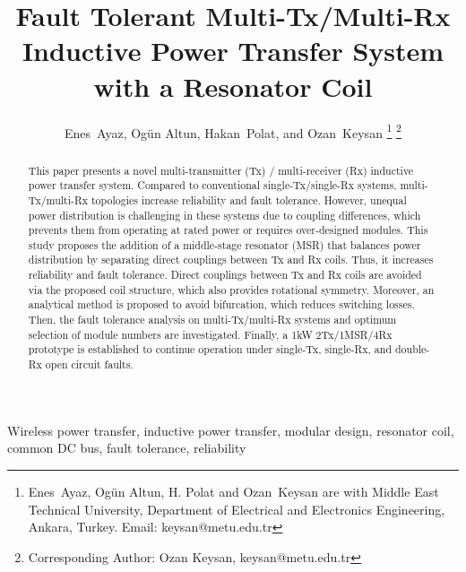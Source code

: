 \documentclass[journal]{IEEEtran}
\begin{document}

\title{ Fault Tolerant Multi-Tx/Multi-Rx Inductive Power Transfer System with a Resonator Coil}
        \author{Enes~Ayaz, Og\"{u}n Altun, Hakan~Polat, and Ozan~Keysan
			 \thanks{ Enes~Ayaz, Og\"{u}n Altun,  H. Polat and Ozan~Keysan are with Middle East Technical University, Department of Electrical and Electronics Engineering, Ankara, Turkey. Email: keysan@metu.edu.tr 
}%
\thanks{Corresponding Author: Ozan Keysan, keysan@metu.edu.tr
}%
}
\maketitle
\begin{abstract}
This paper presents a novel multi-transmitter (Tx) / multi-receiver (Rx) inductive power transfer system. 
Compared to conventional single-Tx/single-Rx systems, multi-Tx/multi-Rx topologies increase reliability and fault tolerance. 
However, unequal power distribution is challenging in these systems due to coupling differences, which prevents them from operating at rated power or requires over-designed modules.
This study proposes the addition of a middle-stage resonator (MSR) that balances power distribution by separating direct couplings between Tx and Rx coils. Thus, it increases reliability and fault tolerance.
Direct couplings between Tx and Rx coils are avoided via the proposed coil structure, which also provides rotational symmetry.
Moreover, an analytical method is proposed to avoid bifurcation, which reduces switching losses.
Then, the fault tolerance analysis on multi-Tx/multi-Rx systems and optimum selection of module numbers are investigated. 
Finally, a 1kW 2Tx/1MSR/4Rx prototype is established to continue operation under single-Tx, single-Rx, and double-Rx open circuit faults.


\end{abstract}
\begin{IEEEkeywords}
Wireless power transfer, inductive power transfer, modular design, resonator coil,  common DC bus, fault tolerance, reliability
\end{IEEEkeywords}

\IEEEpeerreviewmaketitle
\vspace*{-5mm}
\end{document}
